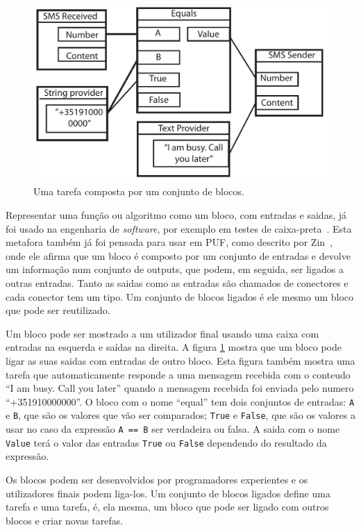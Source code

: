 \documentclass[9pt,a4paper]{extarticle}
\begin{document}
\begin{multicols}{2}
\begin{figure}[hb]
\centerline{\includegraphics[scale=.43]{block_example.pdf}}
\caption{Uma tarefa composta por um conjunto de blocos.} 
\label{fig:block}
\end{figure}

Representar uma função ou algoritmo como um bloco, com entradas e saidas, já foi usado na engenharia de \emph{software}, por exemplo em testes de caixa-preta~\cite{BlackBoxTesting}. Esta metafora também já foi pensada para usar em PUF, como descrito por Zin~\cite{Zin2011}, onde ele afirma que um bloco é composto por um conjunto de entradas e devolve um informação num conjunto de outputs, que podem, em seguida, ser ligados a outras entradas. Tanto as saidas como as entradas são chamados de conectores e cada conector tem um tipo. Um conjunto de blocos ligados é ele mesmo um bloco que pode ser reutilizado.

Um bloco pode ser mostrado a um utilizador final usando uma caixa com entradas na esquerda e saídas na direita. A figura \ref{fig:block} mostra que um bloco pode ligar as suas saidas com entradas de outro bloco.
Esta figura também mostra uma tarefa que automaticamente responde a uma mensagem recebida com o conteudo ``I am busy. Call you later'' quando a mensagem recebida foi enviada pelo numero ``+351910000000''. O bloco com o nome ``equal''
tem dois conjuntos de entradas: \texttt{A} e \texttt{B}, que são os valores que vão ser comparados; \texttt{True} e \texttt{False}, que são os valores a usar no caso da expressão \texttt{A == B} ser verdadeira ou falsa. 
A saida com o nome \texttt{Value} terá o valor das entradas \texttt{True} ou \texttt{False} dependendo do resultado da expressão.

Os blocos podem ser desenvolvidos por programadores experientes e os utilizadores finais podem liga-los. Um conjunto de blocos ligados define uma tarefa e uma tarefa, é, ela mesma, um bloco que pode ser ligado com outros blocos e criar novas tarefas.


\end{multicols}
\end{document}
